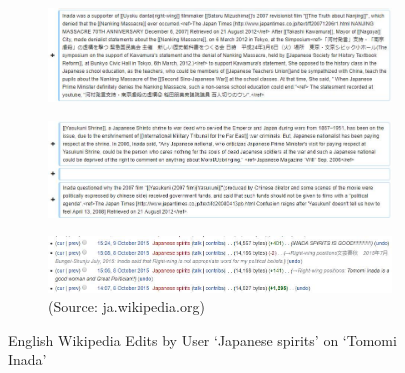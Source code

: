 \documentclass[10pt,british,A4paper,oneside]{memoir}
\begin{document}
\begin{figure}[!htb]
 \centering
 \begin{subfigure}[b]{0.9\textwidth}
 \includegraphics[width=\textwidth]{images/wiki/japanese-spirits-inada1.jpg}
 \end{subfigure}
 \begin{subfigure}[b]{0.9\textwidth}
 \includegraphics[width=\textwidth]{images/wiki/japanese-spirits-inada2.jpg}
 \end{subfigure}
 \begin{subfigure}[b]{0.9\textwidth}
 \includegraphics[width=\textwidth]{images/wiki/japanese-spirits-inada0.jpg}
 \caption*{(Source: ja.wikipedia.org)}
 \end{subfigure}
 \caption{English Wikipedia Edits by User `Japanese spirits' on `Tomomi Inada'}\label{fig:js-inada}
\end{figure}
\end{document}
